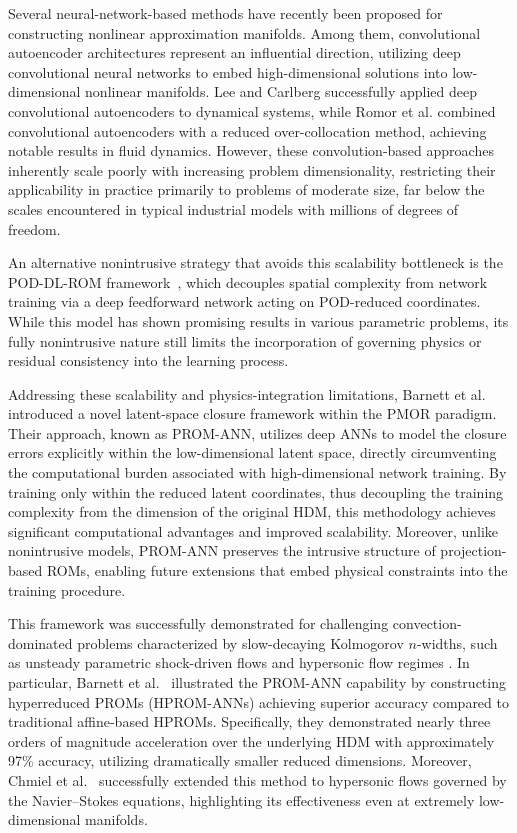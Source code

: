 Several neural-network-based methods have recently been proposed for constructing nonlinear approximation manifolds. Among them, convolutional autoencoder architectures \cite{lee2020model, romor2023non} represent an influential direction, utilizing deep convolutional neural networks to embed high-dimensional solutions into low-dimensional nonlinear manifolds. Lee and Carlberg \cite{lee2020model} successfully applied deep convolutional autoencoders to dynamical systems, while Romor et al. \cite{romor2023non} combined convolutional autoencoders with a reduced over-collocation method, achieving notable results in fluid dynamics. However, these convolution-based approaches inherently scale poorly with increasing problem dimensionality, restricting their applicability in practice primarily to problems of moderate size, far below the scales encountered in typical industrial models with millions of degrees of freedom.

An alternative nonintrusive strategy that avoids this scalability bottleneck is the POD-DL-ROM framework~\cite{FRESCA2022114181}, which decouples spatial complexity from network training via a deep feedforward network acting on POD-reduced coordinates. While this model has shown promising results in various parametric problems, its fully nonintrusive nature still limits the incorporation of governing physics or residual consistency into the learning process.

Addressing these scalability and physics-integration limitations, Barnett et al.~\cite{barnett2023neural} introduced a novel latent-space closure framework within the PMOR paradigm. Their approach, known as PROM-ANN, utilizes deep ANNs to model the closure errors explicitly within the low-dimensional latent space, directly circumventing the computational burden associated with high-dimensional network training. By training only within the reduced latent coordinates, thus decoupling the training complexity from the dimension of the original HDM, this methodology achieves significant computational advantages and improved scalability. Moreover, unlike nonintrusive models, PROM-ANN preserves the intrusive structure of projection-based ROMs, enabling future extensions that embed physical constraints into the training procedure.


This framework was successfully demonstrated for challenging convection-dominated problems characterized by slow-decaying Kolmogorov $n$-widths, such as unsteady parametric shock-driven flows and hypersonic flow regimes \cite{barnett2023neural, chmiel2025unified}. In particular, Barnett et al.~\cite{barnett2023neural} illustrated the PROM-ANN capability by constructing hyperreduced PROMs (HPROM-ANNs) achieving superior accuracy compared to traditional affine-based HPROMs. Specifically, they demonstrated nearly three orders of magnitude acceleration over the underlying HDM with approximately 97\% accuracy, utilizing dramatically smaller reduced dimensions. Moreover, Chmiel et al.~\cite{chmiel2025unified} successfully extended this method to hypersonic flows governed by the Navier–Stokes equations, highlighting its effectiveness even at extremely low-dimensional manifolds.

